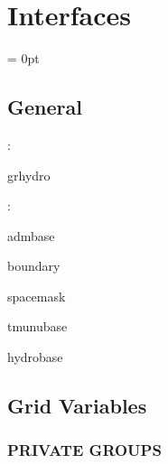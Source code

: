 
\section{Interfaces} 


\parskip = 0pt

\vspace{3mm} \subsection*{General}

: 

grhydro
\vspace{2mm}

: 

admbase

boundary

spacemask

tmunubase

hydrobase
\vspace{2mm}
\subsection*{Grid Variables}
\vspace{5mm}\subsubsection{PRIVATE GROUPS}

\vspace{5mm}

